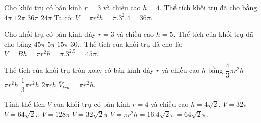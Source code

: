 \begin{ex} %
	Cho khối trụ có bán kính $r=3$ và chiều cao $h=4$. Thể tích khối trụ đã cho bằng
	\choice 
	{ $4 \pi$}
	{ $12 \pi$}
	{ \True$36 \pi$}
	{ $24 \pi$}
	\loigiai
	{Ta có: $V=\pi r^2 h=\pi .3^2 .4=36 \pi.$}
\end{ex}

\begin{ex} %
	Cho khối trụ có bán kính đáy $r=3$ và chiều cao $h=5$. Thể tích của khối trụ đã cho bằng
	\choice 
	{ \True$45 \pi$}
	{ $5 \pi$}
	{ $15 \pi$}
	{ $30 \pi$}
	\loigiai
	{Thể tích của khối trụ đã cho là: $V=Bh=\pi r^2 h=\pi. 3^2.5=45 \pi.$}
\end{ex}

\begin{ex} %
	Thể tích của khối trụ tròn xoay có bán kính đáy $r$ và chiều cao $h$ bằng
	\choice 
	{ $\dfrac{4}{3} \pi r^2 h$}
	{ \True$\pi r^2 h$}
	{ $\dfrac{1}{3} \pi r^2 h$}
	{ $2 \pi r h$}
	\loigiai
	{$\bar{V}_{t r u}=\pi r^2 h $.}
\end{ex}

\begin{ex} %
	Tính thể tích $V$ của khối trụ có bán kính $r=4$ và chiều cao $h=4 \sqrt{2}$.
	\choice 
	{ $V=32 \pi$}
	{ \True $V=64 \sqrt{2} \pi$}
	{ $V=128 \pi$}
	{ $V=32 \sqrt{2} \pi$}
	\loigiai
	{$V=\pi r^2 h=16.4 \sqrt{2} \pi=64 \sqrt{2} \pi$.}
\end{ex}

